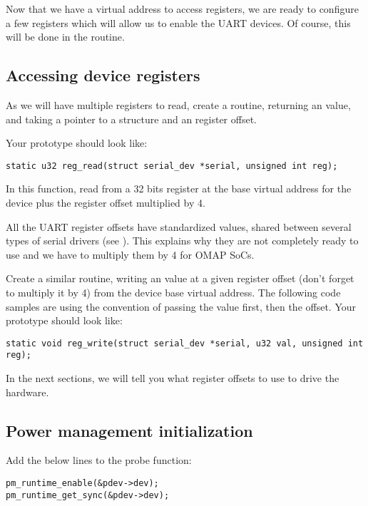 Now that we have a virtual address to access registers, we are ready to
configure a few registers which will allow us to enable the UART
devices. Of course, this will be done in the  routine.

\subsection{Accessing device registers}

As we will have multiple registers to read, create a 
routine, returning an  value, and taking a 
pointer to a  structure and an  register
offset.

Your prototype should look like:
\begin{verbatim}
static u32 reg_read(struct serial_dev *serial, unsigned int reg);
\end{verbatim}

In this function, read from a 32 bits register at the base virtual
address for the device plus the register offset multiplied by 4.

All the UART register offsets have standardized values, shared between
several types of serial drivers (see
). This explains why they are not
completely ready to use and we have to multiply them by 4 for OMAP SoCs.

Create a similar  routine, writing an 
value at a given register offset (don't forget to multiply it by 4) from
the device base virtual address. The following code samples are using
the  convention of passing the value first, then the
offset. Your prototype should look like:
\begin{verbatim}
static void reg_write(struct serial_dev *serial, u32 val, unsigned int reg);
\end{verbatim}

In the next sections, we will tell you what register offsets to use
to drive the hardware.

\subsection{Power management initialization}

Add the below lines to the probe function:

\begin{verbatim}
pm_runtime_enable(&pdev->dev);
pm_runtime_get_sync(&pdev->dev);
\end{verbatim}

